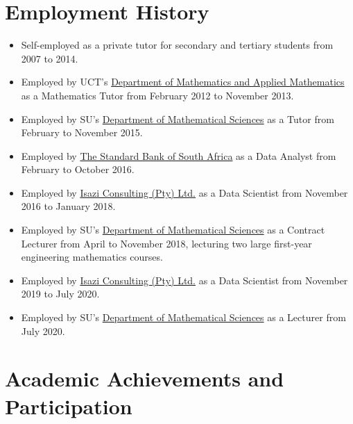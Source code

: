 \documentclass{article}
\begin{document}
\section{Employment History}
\begin{itemize}
	\item Self-employed as a private tutor for secondary and tertiary students from 2007 to 2014.
	\item Employed by UCT's \href{http://www.math.uct.ac.za/}{Department of Mathematics and Applied Mathematics} as a Mathematics Tutor from February 2012 to November 2013.
	\item Employed by SU's \href{http://www.sun.ac.za/english/faculty/science/Mathematics}{Department of Mathematical Sciences} as a Tutor from February to November 2015.
	\item Employed by \href{https://www.standardbank.co.za/}{The Standard Bank of South Africa} as a Data Analyst from February to October 2016.
	\item Employed by \href{http://www.isaziconsulting.co.za}{Isazi Consulting (Pty) Ltd.} as a Data Scientist from November 2016 to January 2018.
	\item Employed by SU's \href{http://www.sun.ac.za/english/faculty/science/Mathematics}{Department of Mathematical Sciences} as a Contract Lecturer from April to November 2018, lecturing two large first-year engineering mathematics courses.
	\item Employed by \href{http://www.isaziconsulting.co.za}{Isazi Consulting (Pty) Ltd.} as a Data Scientist from November 2019 to July 2020.
	\item Employed by SU's \href{http://www.sun.ac.za/english/faculty/science/Mathematics}{Department of Mathematical Sciences} as a Lecturer from July 2020.
\end{itemize}


\section{Academic Achievements and Participation}
\end{document}
